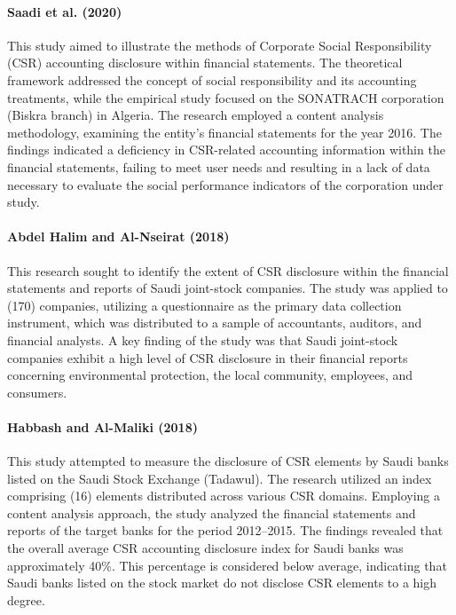 \documentclass[10pt]{NSP1}
\begin{document}
\paragraph{Saadi et al. (2020) \cite{Saadi2020}} This study aimed to illustrate the methods of Corporate Social Responsibility (CSR) accounting disclosure within financial statements. The theoretical framework addressed the concept of social responsibility and its accounting treatments, while the empirical study focused on the SONATRACH corporation (Biskra branch) in Algeria. The research employed a content analysis methodology, examining the entity's financial statements for the year 2016. The findings indicated a deficiency in CSR-related accounting information within the financial statements, failing to meet user needs and resulting in a lack of data necessary to evaluate the social performance indicators of the corporation under study.

\paragraph{Abdel Halim and Al-Nseirat (2018) \cite{AbdelHalim2018}} This research sought to identify the extent of CSR disclosure within the financial statements and reports of Saudi joint-stock companies. The study was applied to (170) companies, utilizing a questionnaire as the primary data collection instrument, which was distributed to a sample of accountants, auditors, and financial analysts. A key finding of the study was that Saudi joint-stock companies exhibit a high level of CSR disclosure in their financial reports concerning environmental protection, the local community, employees, and consumers.

\paragraph{Habbash and Al-Maliki (2018) \cite{Habbash2018}} This study attempted to measure the disclosure of CSR elements by Saudi banks listed on the Saudi Stock Exchange (Tadawul). The research utilized an index comprising (16) elements distributed across various CSR domains. Employing a content analysis approach, the study analyzed the financial statements and reports of the target banks for the period 2012--2015. The findings revealed that the overall average CSR accounting disclosure index for Saudi banks was approximately 40\%. This percentage is considered below average, indicating that Saudi banks listed on the stock market do not disclose CSR elements to a high degree.
\end{document}
